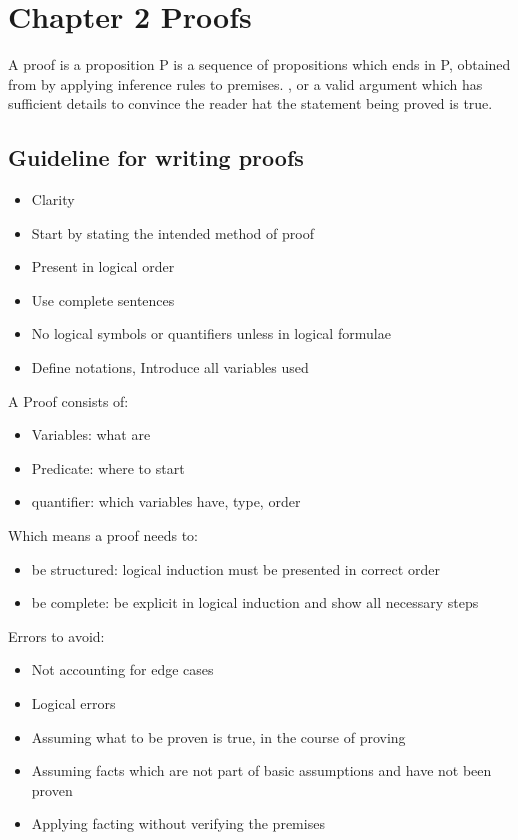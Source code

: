 \documentclass[14pt]{article}
\theoremstyle{definition}
\begin{document}
\section{Chapter 2 Proofs}
A proof is a proposition P is a sequence of propositions which ends in P, obtained from by applying inference rules to premises.
, or a valid argument which has sufficient details to convince the reader hat the statement being proved is true.

\subsection*{Guideline for writing proofs}
\begin{itemize}
    \item Clarity
    \item Start by stating the intended method of proof
    \item Present in logical order
    \item Use complete sentences
    \item No logical symbols or quantifiers unless in logical formulae
    \item Define notations, Introduce all variables used
\end{itemize}
A Proof consists of:
\begin{itemize}
    \item Variables: what are
    \item Predicate: where to start
    \item quantifier: which variables have, type, order
\end{itemize}
Which means a proof needs to: 
\begin{itemize}
    \item be structured: logical induction must be presented in correct order
    \item be complete: be explicit in logical induction and show all necessary steps
\end{itemize}
Errors to avoid:
\begin{itemize}
    \item Not accounting for edge cases
    \item Logical errors 
    \item Assuming what to be proven is true, in the course of proving
    \item Assuming facts which are not part of basic assumptions and have not been proven
    \item Applying facting without verifying the premises
\end{itemize}
\end{document}
